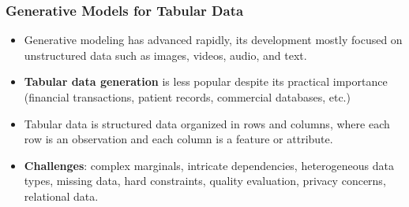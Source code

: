 \begin{frame}
%

\end{frame}




\begin{frame}

\frametitle{Generative Models for Tabular Data}

\begin{itemize}
    \item Generative modeling has advanced rapidly, its development mostly focused on unstructured data such as images, videos, audio, and text.
    \item \textbf{Tabular data generation} is less popular despite its practical importance (financial transactions, patient records, commercial databases, etc.)
    \item Tabular data is structured data organized in rows and columns, where each row is an observation and each column is a feature or attribute.
    \bigskip
    
    \bigskip
    \item \textbf{Challenges}: complex marginals, intricate dependencies, heterogeneous data types, missing data, hard constraints, quality evaluation, privacy concerns, relational data.
\end{itemize}


\end{frame}


